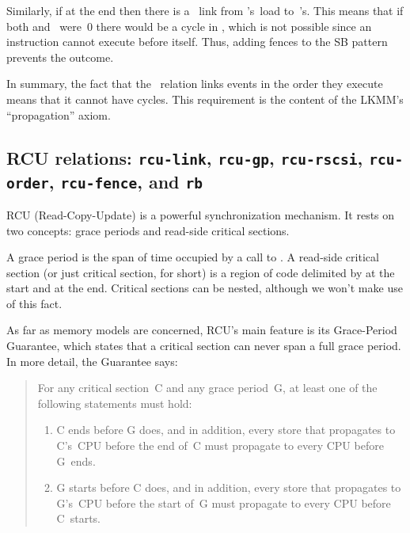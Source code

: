 Similarly, if  at the end then there is a ~link from
's~load to~'s.
This means that if both  and~ were~0 there would be a
cycle in , which is not possible since an instruction cannot execute
before itself.
Thus, adding  fences to the SB pattern prevents
the  outcome.

In summary, the fact that the ~relation links events in the order
they execute means that it cannot have cycles.
This requirement is the content of the LKMM's ``propagation'' axiom.


\subsection{RCU relations: \texttt{rcu-link}, \texttt{rcu-gp}, \texttt{rcu-rscsi}, \texttt{rcu-order}, \texttt{rcu-fence}, and \texttt{rb}}
\label{sec:docs:explanation:RCU Relations: rcu-link, rcu-gp, rcu-rscsi, rcu-order, rcu-fence, and rb}

RCU (Read-Copy-Update) is a powerful synchronization mechanism.
It rests on two concepts: grace periods and read-side critical sections.

A grace period is the span of time occupied by a call to
.
A read-side critical section (or just critical section, for short) is
a region of code delimited by  at the start and
 at the end.
Critical sections can be nested, although we won't make use of this fact.

As far as memory models are concerned, RCU's main feature is its
Grace-Period Guarantee, which states that a critical section can never
span a full grace period.
In more detail, the Guarantee says:

\begin{quote}
  For any critical section~C and any grace period~G, at least one of
  the following statements must hold:

  \begin{enumerate}
  \item	C ends before G does, and in addition, every store that
	propagates to C's~CPU before the end of~C must propagate to
	every CPU before G~ends.

  \item	G starts before C does, and in addition, every store that
	propagates to G's~CPU before the start of~G must propagate
	to every CPU before C~starts.
  \end{enumerate}
\end{quote}

